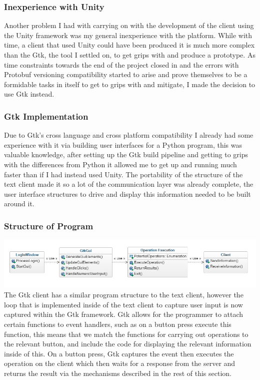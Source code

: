 \documentclass{article}
\begin{document}
\subsubsection{Inexperience with Unity}

Another problem I had with carrying on with the development of the client using the Unity framework was my general inexperience with the platform. While with time, a client that used Unity could have been produced it is much more complex than the Gtk, the tool I settled on, to get grips with and produce a prototype. As time constraints towards the end of the project closed in and the errors with Protobuf versioning compatibility started to arise and prove themselves to be a formidable tasks in itself to get to grips with and mitigate, I made the decision to use Gtk instead.

\subsubsection{Gtk Implementation}

Due to Gtk’s cross language and cross platform compatibility I already had some experience with it via building user interfaces for a Python program, this was valuable knowledge, after setting up the Gtk build pipeline and getting to grips with the differences from Python it allowed me to get up and running much faster than if I had instead used Unity. The portability of the structure of the text client made it so a lot of the communication layer was already complete, the user interface structures to drive and display this information needed to be built around it.
\subsubsection{Structure of Program}
\includegraphics[width=\textwidth]{gtkclient.png}
The Gtk client has a similar program structure to the text client, however the loop that is implemented inside of the text client to capture user input is now captured within the Gtk framework. Gtk allows for the programmer to attach certain functions to event handlers, such as on a button press execute this function, this means that we match the functions for carrying out operations to the relevant button, and include the code for displaying the relevant information inside of this. On a button press, Gtk captures the event then executes the operation on the client which then waits for a response from the server and returns the result via the mechanisms described in the rest of this section.
\end{document}
